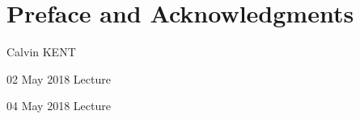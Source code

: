 \documentclass[11pt]{article} %
\begin{document}
	\renewcommand*{\Term}{Spring 2018} %
	\renewcommand*{\CourseCode}{MATH 245} %
	\renewcommand*{\CourseName}{Linear Algebra 2 (Advanced Level)} %
	\renewcommand*{\ProfName}{Spiro Karigiannis} %
	\renewcommand*{\LDate}{00 MONTH 201x} %
	\renewcommand*{\COlink}{http://www.student.math.uwaterloo.ca/~c2kent/} %
	\lecturetitle
	\tableofcontents
	\cleardoublepage
	\newpage
	\section*{Preface and Acknowledgments}
	\CKpreface
	\rrule
	\hfill Calvin KENT
	\cleardoublepage
	\newpage
	\pagestyle{Lecture}
	\fancyhfoffset[E,O]{0pt} %
	\begin{comment}
	\end{comment}
\begin{lec}{02 May 2018}
	Lecture
\end{lec}
\begin{lec}{04 May 2018}
	Lecture
\end{lec}
\end{document}

